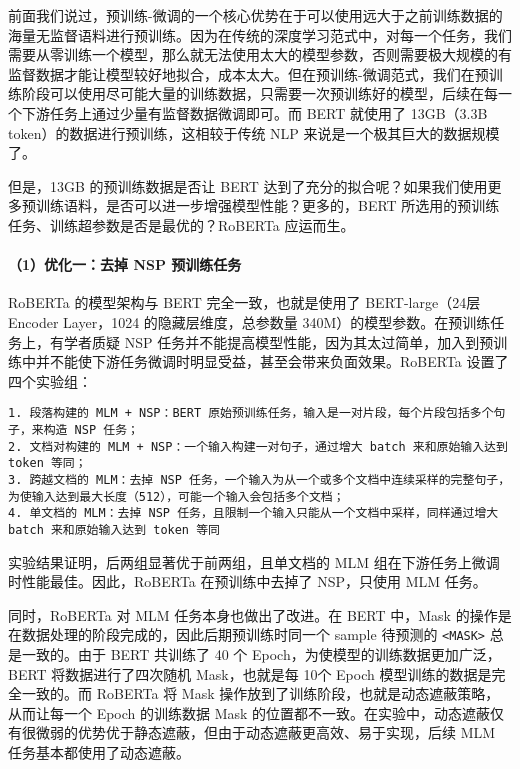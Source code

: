 \documentclass[
]{article}
\begin{document}
前面我们说过，预训练-微调的一个核心优势在于可以使用远大于之前训练数据的海量无监督语料进行预训练。因为在传统的深度学习范式中，对每一个任务，我们需要从零训练一个模型，那么就无法使用太大的模型参数，否则需要极大规模的有监督数据才能让模型较好地拟合，成本太大。但在预训练-微调范式，我们在预训练阶段可以使用尽可能大量的训练数据，只需要一次预训练好的模型，后续在每一个下游任务上通过少量有监督数据微调即可。而
BERT 就使用了 13GB（3.3B token）的数据进行预训练，这相较于传统 NLP
来说是一个极其巨大的数据规模了。

但是，13GB 的预训练数据是否让 BERT
达到了充分的拟合呢？如果我们使用更多预训练语料，是否可以进一步增强模型性能？更多的，BERT
所选用的预训练任务、训练超参数是否是最优的？RoBERTa 应运而生。

\paragraph{（1）优化一：去掉 NSP
预训练任务}\label{ux4f18ux5316ux4e00ux53bbux6389-nsp-ux9884ux8badux7ec3ux4efbux52a1}

RoBERTa 的模型架构与 BERT 完全一致，也就是使用了 BERT-large（24层
Encoder Layer，1024 的隐藏层维度，总参数量
340M）的模型参数。在预训练任务上，有学者质疑 NSP
任务并不能提高模型性能，因为其太过简单，加入到预训练中并不能使下游任务微调时明显受益，甚至会带来负面效果。RoBERTa
设置了四个实验组：

\begin{verbatim}
1. 段落构建的 MLM + NSP：BERT 原始预训练任务，输入是一对片段，每个片段包括多个句子，来构造 NSP 任务；
2. 文档对构建的 MLM + NSP：一个输入构建一对句子，通过增大 batch 来和原始输入达到 token 等同；
3. 跨越文档的 MLM：去掉 NSP 任务，一个输入为从一个或多个文档中连续采样的完整句子，为使输入达到最大长度（512），可能一个输入会包括多个文档；
4. 单文档的 MLM：去掉 NSP 任务，且限制一个输入只能从一个文档中采样，同样通过增大 batch 来和原始输入达到 token 等同
\end{verbatim}

实验结果证明，后两组显著优于前两组，且单文档的 MLM
组在下游任务上微调时性能最佳。因此，RoBERTa 在预训练中去掉了 NSP，只使用
MLM 任务。

同时，RoBERTa 对 MLM 任务本身也做出了改进。在 BERT 中，Mask
的操作是在数据处理的阶段完成的，因此后期预训练时同一个 sample 待预测的
\texttt{\textless{}MASK\textgreater{}} 总是一致的。由于 BERT 共训练了 40
个 Epoch，为使模型的训练数据更加广泛，BERT 将数据进行了四次随机
Mask，也就是每 10个 Epoch 模型训练的数据是完全一致的。而 RoBERTa 将 Mask
操作放到了训练阶段，也就是动态遮蔽策略，从而让每一个 Epoch 的训练数据
Mask
的位置都不一致。在实验中，动态遮蔽仅有很微弱的优势优于静态遮蔽，但由于动态遮蔽更高效、易于实现，后续
MLM 任务基本都使用了动态遮蔽。
\end{document}
